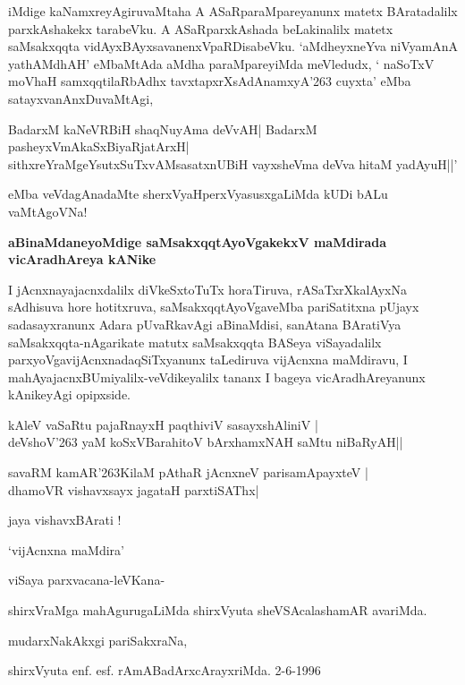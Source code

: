 iMdige kaNamxreyAgiruvaMtaha A ASaRparaMpareyanunx matetx BAratadalilx parxkAshakekx tarabeVku. A ASaRparxkAshada beLakinalilx matetx saMsakxqqta vidAyxBAyxsavanenxVpaRDisabeVku. `aMdheyxneYva niVyamAnA yathAMdhAH' eMbaMtAda aMdha paraMpareyiMda meVledudx, ` naSoTxV moVhaH samxqqtilaRbAdhx tavxtapxrXsAdAnamxyA\char'263 cuyxta' eMba satayxvanAnxDuvaMtAgi,

\begin{shloka}
BadarxM kaNeVRBiH shaqNuyAma deVvAH| BadarxM pasheyxVmAkaSxBiyaRjatArxH|\\
sithxreYraMgeYsutxSuTxvAMsasatxnUBiH vayxsheVma deVva hitaM yadAyuH||'
\end{shloka}

eMba veVdagAnadaMte sherxVyaHperxVyasusxgaLiMda kUDi bALu vaMtAgoVNa!

\textbf{aBinaMdaneyoMdige saMsakxqqtAyoVgakekxV maMdirada vicAradhAreya kANike}

I jAcnxnayajacnxdalilx diVkeSxtoTuTx horaTiruva, rASaTxrXkalAyxNa sAdhisuva hore hotitxruva, saMsakxqqtAyoVgaveMba pariSatitxna pUjayx sadasayxranunx Adara pUvaRkavAgi aBinaMdisi, sanAtana BAratiVya saMsakxqqta-nAgarikate matutx saMsakxqqta BASeya viSayadalilx parxyoVgavijAcnxnadaqSiTxyanunx taLediruva vijAcnxna maMdiravu, I mahAyajacnxBUmiyalilx-veVdikeyalilx tananx I bageya vicAradhAreyanunx kAnikeyAgi opipxside.

\begin{shloka}
kAleV vaSaRtu pajaRnayxH paqthiviV sasayxshAliniV |\\
deVshoV\char'263 yaM koSxVBarahitoV bArxhamxNAH saMtu niBaRyAH||
\end{shloka}

\begin{shloka}
savaRM kamAR\char'263KilaM pAthaR jAcnxneV parisamApayxteV |\\
dhamoVR vishavxsayx jagataH parxtiSAThx|
\end{shloka}

\begin{center}
jaya vishavxBArati !
\end{center}

\hfill `vijAcnxna maMdira'

\medskip
viSaya parxvacana-\hfill leVKana-

shirxVraMga mahAgurugaLiMda \hfill shirxVyuta sheVSAcalashamAR avariMda.

\begin{center}
mudarxNakAkxgi pariSakxraNa,
\end{center}

shirxVyuta enf. esf. rAmABadArxcArayxriMda. 2-6-1996


